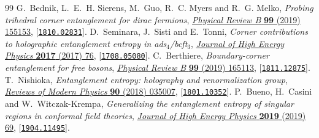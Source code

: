 \documentclass[10pt,a4paper]{amsart}
\theoremstyle{definition}
\begin{document}
\begin{thebibliography}{99}
 G.~Bednik, L.~E.~H. Sierens, M.~Guo, R.~C. Myers and R.~G. Melko, \emph{Probing trihedral corner entanglement for dirac fermions}, \href{http://dx.doi.org/10.1103/PhysRevB.99.155153}{\emph{Physical Review B} {\bf 99} (2019) 155153}, [\href{https://arxiv.org/abs/1810.02831}{{\tt 1810.02831}}].
 D.~Seminara, J.~Sisti and E.~Tonni, \emph{Corner contributions to holographic entanglement entropy in ads$_4$/bcft$_3$}, \href{http://dx.doi.org/10.1007/JHEP11(2017)076}{\emph{Journal of High Energy Physics} {\bf 2017} (2017) 76}, [\href{https://arxiv.org/abs/1708.05080}{{\tt 1708.05080}}].
 C.~Berthiere, \emph{Boundary-corner entanglement for free bosons}, \href{http://dx.doi.org/10.1103/PhysRevB.99.165113}{\emph{Physical Review B} {\bf 99} (2019) 165113}, [\href{https://arxiv.org/abs/1811.12875}{{\tt 1811.12875}}].
 T.~Nishioka, \emph{Entanglement entropy: holography and renormalization group}, \href{http://dx.doi.org/10.1103/RevModPhys.90.035007}{\emph{Reviews of Modern Physics} {\bf 90} (2018) 035007}, [\href{https://arxiv.org/abs/1801.10352}{{\tt 1801.10352}}].
 P.~Bueno, H.~Casini and W.~Witczak-Krempa, \emph{Generalizing the entanglement entropy of singular regions in conformal field theories}, \href{http://dx.doi.org/10.1007/JHEP08(2019)069}{\emph{Journal of High Energy Physics} {\bf 2019} (2019) 69}, [\href{https://arxiv.org/abs/1904.11495}{{\tt 1904.11495}}].
\end{thebibliography}
\end{document}
